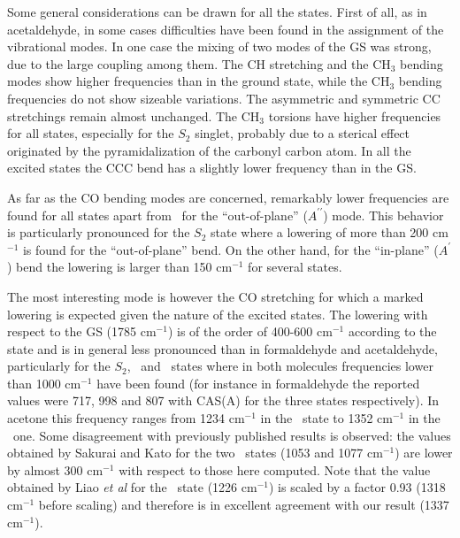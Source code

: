 Some general considerations can be drawn for all the states.  First of all,
as in acetaldehyde, in some cases difficulties have been found in the
assignment of the vibrational modes.  In one case the mixing of two modes of
the GS was strong, due to the large coupling among them.  The CH stretching
and the CH$_3$ bending modes show higher frequencies than in the ground
state, while the CH$_3$ bending frequencies do not show sizeable variations.
The asymmetric and symmetric CC stretchings remain almost unchanged.  The
CH$_3$ torsions have higher frequencies for all states, especially for the
$S_2$ singlet, probably due to a sterical effect originated by the
pyramidalization of the carbonyl carbon atom.  In all the excited states the
CCC bend has a slightly lower frequency than in the GS.  

As far as the CO bending modes are concerned, remarkably lower frequencies
are found for all states apart from \snpi\ for the ``out-of-plane''
($A^{\prime\prime}$) mode.  This behavior is particularly pronounced for the
$S_2$  state where a lowering of more than 200 cm$^{-1}$ is found for the
``out-of-plane''  bend. On the other hand, for the ``in-plane''
($A^{\prime}$) bend the lowering is larger than 150 cm$^{-1}$ for several
states.



The most interesting mode is however the CO stretching for which a marked
lowering is expected given the nature of the excited states. The lowering
with respect to the GS (1785 cm$^{-1}$) is of the order of 400-600
cm$^{-1}$ according to  the state and is in general less pronounced than in
formaldehyde and acetaldehyde, particularly for the $S_2$, \tpipi\ and
\tspi\ states where in both molecules frequencies lower than 1000 cm$^{-1}$
have been found (for instance in formaldehyde the reported values were 717,
998 and 807 with CAS(A) for the three states respectively).  In acetone this
frequency ranges from 1234 cm$^{-1}$ in the \tspi\ state to 1352 cm$^{-1}$
in the \tnpi\ one. Some disagreement with previously published results is
observed: the values obtained by Sakurai and Kato
\cite{jms_theo-461-145-1999} for the two \npi\ states (1053 and 1077
cm$^{-1}$) are lower by almost 300 cm$^{-1}$ with respect to those here
computed.  Note that the value obtained by Liao {\it et al}
\cite{jcp-111-205-1999} for the \snpi\ state (1226 cm$^{-1}$) is scaled by a
factor 0.93 (1318 cm$^{-1}$ before scaling) and therefore is in excellent
agreement with our result (1337 cm$^{-1}$).

